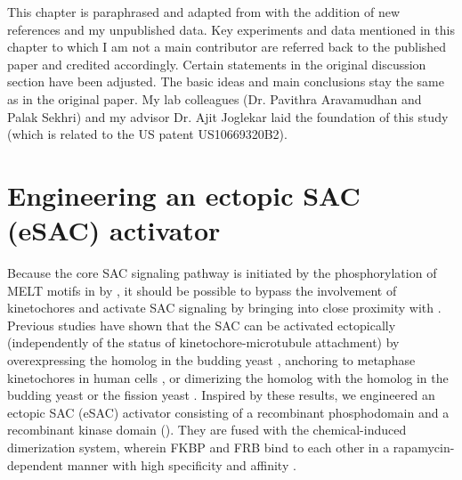 This chapter is paraphrased and adapted from \cite{eSAC} with the addition of new references and my unpublished data. Key experiments and data mentioned in this chapter to which I am not a main contributor are referred back to the published paper and credited accordingly. Certain statements in the original discussion section have been adjusted. The basic ideas and main conclusions stay the same as in the original paper. My lab colleagues (Dr. Pavithra Aravamudhan and Palak Sekhri) and my advisor Dr. Ajit Joglekar laid the foundation of this study (which is related to the US patent US10669320B2). %

\section{Engineering an ectopic SAC (eSAC) activator}

Because the core SAC signaling pathway is initiated by the phosphorylation of MELT motifs in  by  \cite{MPS1-KNL1_London2012, MPS1-KNL1_Shepperd2012, MPS1-KNL1_Yamagishi2012}, it should be possible to bypass the involvement of kinetochores and activate SAC signaling by bringing  into close proximity with . Previous studies have shown that the SAC can be activated ectopically (independently of the status of kinetochore-microtubule attachment) by overexpressing the  homolog in the budding yeast \cite{Mps1pOverexpressionActivatesSAC}, anchoring  to metaphase kinetochores in human cells \cite{HeLa-A12_Ballister2014}, or dimerizing the  homolog with the  homolog in the budding yeast \cite{BuddingYeasteSAC} or the fission yeast \cite{FissionYeasteSAC}. Inspired by these results, we engineered an ectopic SAC (eSAC) activator consisting of a recombinant  phosphodomain and a recombinant  kinase domain (). They are fused with the chemical-induced dimerization system, wherein FKBP and FRB bind to each other in a rapamycin-dependent manner with high specificity and affinity \cite{FKBP-Rapamycin-FRB}.


